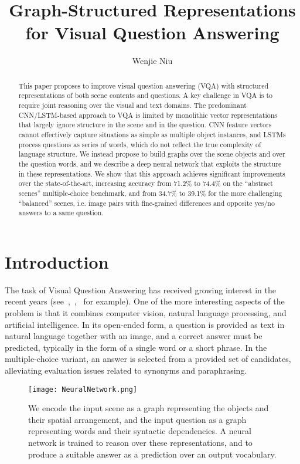 \documentclass[10pt,twocolumn,letterpaper]{article}
\begin{document}
\title{Graph-Structured Representations for Visual Question Answering}
\author{Wenjie Niu}
\maketitle

\begin{abstract}
   This paper proposes to improve visual question answering
(VQA) with structured representations of both scene
contents and questions. A key challenge in VQA is to require
joint reasoning over the visual and text domains. The predominant
CNN/LSTM-based approach to VQA is limited by
monolithic vector representations that largely ignore structure
in the scene and in the question. CNN feature vectors
cannot effectively capture situations as simple as multiple
object instances, and LSTMs process questions as series
of words, which do not reflect the true complexity of language
structure. We instead propose to build graphs over
the scene objects and over the question words, and we describe
a deep neural network that exploits the structure in
these representations. We show that this approach achieves
significant improvements over the state-of-the-art, increasing
accuracy from 71.2\% to 74.4\% on the “abstract scenes”
multiple-choice benchmark, and from 34.7\% to 39.1\% for
the more challenging “balanced” scenes, i.e. image pairs
with fine-grained differences and opposite yes/no answers
to a same question.
\end{abstract}


\section{Introduction}
The task of Visual Question Answering has received
growing interest in the recent years (see~\cite{Malinowski2014A},~\cite{AntolALMBZP15},~\cite{WuTWSDH16} for example).
One of the more interesting aspects of the problem
is that it combines computer vision, natural language processing,
and artificial intelligence. In its open-ended form,
a question is provided as text in natural language together
with an image, and a correct answer must be predicted, typically
in the form of a single word or a short phrase. In the
multiple-choice variant, an answer is selected from a provided
set of candidates, alleviating evaluation issues related
to synonyms and paraphrasing.\par

\begin{figure}[H]
\begin{center}
\texttt{[image: NeuralNetwork.png]}
\end{center}
   \caption{We encode the input scene as a graph representing the
objects and their spatial arrangement, and the input question as a graph representing words and their syntactic dependencies. A neural network is trained to reason over these representations, and to produce a suitable answer as a prediction over an output vocabulary.}
\label{fig:NeuralNetwork}
\end{figure}
\end{document}
